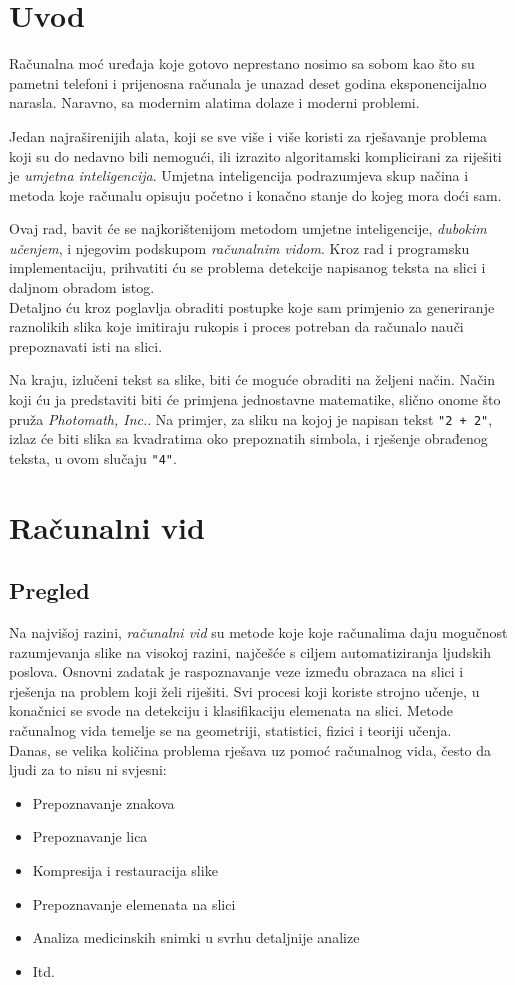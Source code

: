 \section{Uvod}
Računalna moć uređaja koje gotovo neprestano nosimo sa sobom kao što su pametni telefoni i prijenosna računala je unazad deset godina eksponencijalno narasla. Naravno, sa modernim alatima dolaze i moderni problemi. 


Jedan najraširenijih alata, koji se sve više i više koristi za rješavanje problema koji su do nedavno bili nemogući, ili izrazito algoritamski komplicirani za riješiti je \emph{umjetna inteligencija}.
Umjetna inteligencija podrazumjeva skup načina i metoda koje računalu opisuju početno i konačno stanje do kojeg mora doći sam.


Ovaj rad, bavit će se najkorištenijom metodom umjetne inteligencije, \emph{dubokim učenjem}, i njegovim podskupom \emph{računalnim vidom}.
Kroz rad i programsku implementaciju, prihvatiti ću se problema detekcije napisanog teksta na slici i daljnom obradom istog. \\
Detaljno ću kroz poglavlja obraditi postupke koje sam primjenio za generiranje raznolikih slika koje imitiraju rukopis i proces potreban da računalo nauči prepoznavati isti na slici.


Na kraju, izlučeni tekst sa slike, biti će moguće obraditi na željeni način.
Način koji ću ja predstaviti biti će primjena jednostavne matematike, slično onome što pruža \emph{Photomath, Inc.}. 
Na primjer, za sliku na kojoj je napisan tekst \texttt{"2 + 2"}, izlaz će biti slika sa kvadratima oko prepoznatih simbola, i rješenje obrađenog teksta, u ovom slučaju \texttt{"4"}.

\section{Računalni vid}

\subsection{Pregled}
Na najvišoj razini, \emph{računalni vid} su metode koje koje računalima daju mogučnost razumjevanja slike na visokoj razini, najčešće s ciljem automatiziranja ljudskih poslova.
Osnovni zadatak je raspoznavanje veze između obrazaca na slici i rješenja na problem koji želi riješiti. Svi procesi koji koriste strojno učenje, u konačnici se svode na  detekciju i klasifikaciju elemenata na slici. Metode računalnog vida temelje se na geometriji, statistici, fizici i teoriji učenja. \\
Danas, se velika količina problema rješava uz pomoć računalnog vida, često da ljudi za to nisu ni svjesni:
\begin{itemize}
\item Prepoznavanje znakova
\item Prepoznavanje lica
\item Kompresija i restauracija slike
\item Prepoznavanje elemenata na slici
\item Analiza medicinskih snimki u svrhu detaljnije analize
\item Itd.
\end{itemize} 

